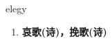 
\begin{frame}
{\huge elegy}
\begin{center}
\begin{enumerate}\Large
  \item \textbf{哀歌(诗)，挽歌(诗)}
\end{enumerate}
\end{center}
\end{frame}
